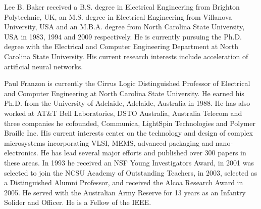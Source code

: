 \documentclass[journal]{IEEEtran}
\begin{document}
% 
\begin{IEEEbiographynophoto}{Lee B. Baker}
received a B.S. degree in Electrical Engineering from Brighton Polytechnic, UK, an M.S. degree in Electrical Engineering from Villanova University, USA and an M.B.A. degree from North Carolina State University, USA in 1983, 1994 and 2009 respectively. He is currently pursuing the Ph.D. degree with the Electrical and Computer Engineering Department at North Carolina State University.
His current research interests include acceleration of artificial neural networks.
\end{IEEEbiographynophoto}
\begin{IEEEbiographynophoto}{Paul Franzon}
is currently the Cirrus Logic Distinguished Professor of Electrical and Computer Engineering at North Carolina State University.  He earned his Ph.D. from the University of Adelaide, Adelaide, Australia in 1988.  He has also worked at AT\&T Bell Laboratories, DSTO Australia, Australia Telecom and three companies he cofounded, Communica, LightSpin Technologies and Polymer Braille Inc. His current interests center on the technology and design of complex microsystems incorporating VLSI, MEMS, advanced packaging and nano-electronics. He has lead several major efforts and published over 300 papers in these areas.  In 1993 he received an NSF Young Investigators Award, in 2001 was selected to join the NCSU Academy of Outstanding Teachers, in 2003, selected as a Distinguished Alumni Professor, and received the Alcoa Research Award in 2005.  He served with the Australian Army Reserve for 13 years as an Infantry Solider and Officer.  He is a Fellow of the IEEE.
\end{IEEEbiographynophoto}






\end{document}
